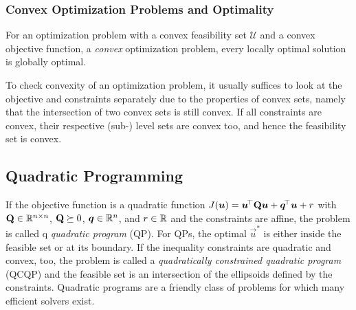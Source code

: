 			\subsubsection{Convex Optimization Problems and Optimality}
				\begin{theorem}
					For an optimization problem with a convex feasibility set \( \mathcal{U} \) and a convex objective function, a \emph{convex} optimization problem, every locally optimal solution is globally optimal.
				\end{theorem}

				To check convexity of an optimization problem, it usually suffices to look at the objective and constraints separately due to the properties of convex sets, namely that the intersection of two convex sets is still convex. If all constraints are convex, their respective (sub-) level sets are convex too, and hence the feasibility set is convex.

		\subsection{Quadratic Programming}
			If the objective function is a quadratic function \( J(\bm{u}) = \bm{u}^{\!\top} \bm{\mathrm{Q}} \bm{u} + \bm{q}^{\!\top} \bm{u} + r \) with \( \bm{\mathrm{Q}} \in \mathbb{R}^{n \times n} \), \( \bm{\mathrm{Q}} \succeq 0 \), \( \bm{q} \in \mathbb{R}^n \), and \( r \in \mathbb{R} \) and the constraints are affine, the problem is called q \emph{quadratic program} (QP). For QPs, the optimal \(\vec{u}^\ast\) is either inside the feasible set or at its boundary. If the inequality constraints are quadratic and convex, too, the problem is called a \emph{quadratically constrained quadratic program} (QCQP) and the feasible set is an intersection of the ellipsoids defined by the constraints. Quadratic programs are a friendly class of problems for which many efficient solvers exist.

